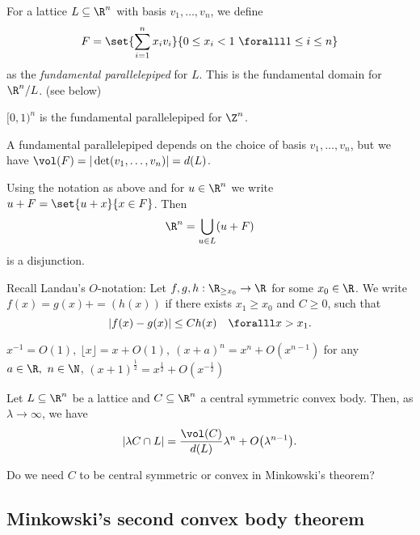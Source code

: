 \begin{notat*}
	For a lattice \( L \subseteq \R^n \) with basis \( v_1, \dotsc, v_n \), we define
	\[ F = \set{\sum_{i=1}^{n} x_i v_i}{0 \leq x_i < 1 \ \foralll 1 \leq i \leq n} \]
	as the \emph{fundamental parallelepiped} for \( L \).
	This is the fundamental domain for \( \R^n/L \). (see below)
\end{notat*}

\begin{exmp*}
	\( [0,1)^n \) is the fundamental parallelepiped for \( \Z^n \).
\end{exmp*}

\begin{rem*}
	A fundamental parallelepiped depends on the choice of basis \( v_1, \dotsc, v_n \), but we have \( \vol(F) = |\det(v_1, \dotsc, v_n)| = d(L) \).
\end{rem*}

\begin{lem}
	Using the notation as above and for \( u \in \R^n \) we write \( u + F = \set{u+x}{x \in F} \).
	Then
	\[ \R^n = \bigcup_{u \in L} (u+F) \]
	is a disjunction.
\end{lem}

\begin{rem*}
	Recall Landau's \( O \)-notation: Let \( f, g, h: \R_{\geq x_0} \to \R \) for some \( x_0 \in \R \).
	We write \( f(x) = g(x) + =(h(x)) \) if there exists \( x_1 \geq x_0 \) and \( C \geq 0 \), such that
	\[ |f(x) - g(x)| \leq C h(x) \quad \foralll x > x_1. \]
\end{rem*}

\begin{exmp*}
	\( x^{-1} = O(1),\ \lfloor x \rfloor = x + O(1),\ (x+a)^n = x^n + O(x^{n-1}) \) for any \( a \in \R,\ n \in \N \), \( (x+1)^\frac{1}{2} = x^\frac{1}{2} + O(x^{-\frac{1}{2}}) \)
\end{exmp*}

\begin{lem}
	Let \( L \subseteq \R^n \) be a lattice and \( C \subseteq \R^n \) a central symmetric convex body.
	Then, as \( \lambda \to \infty \), we have
	\[ |\lambda C \cap L| = \frac{\vol(C)}{d(L)} \lambda^n + O \big(\lambda^{n-1} \big). \]
\end{lem}

\begin{frage*}
	Do we need \( C \) to be central symmetric or convex in Minkowski's theorem?
\end{frage*}

\subsection*{Minkowski's second convex body theorem}

